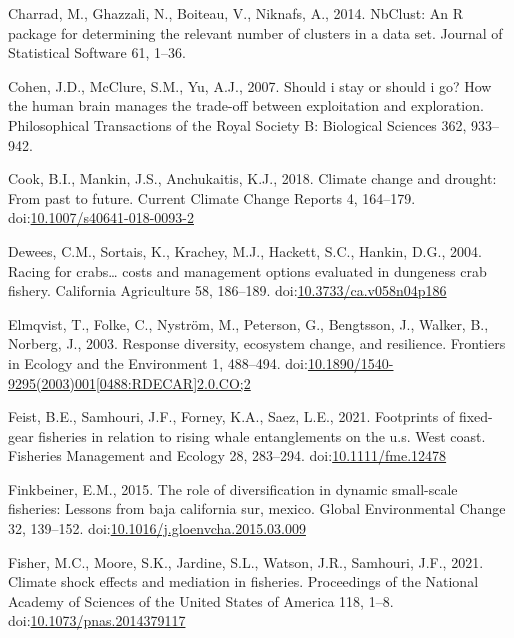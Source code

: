 \documentclass[]{elsarticle} %
\begin{document}
\leavevmode\hypertarget{ref-nbclust2014}{}%
Charrad, M., Ghazzali, N., Boiteau, V., Niknafs, A., 2014. NbClust: An R
package for determining the relevant number of clusters in a data set.
Journal of Statistical Software 61, 1--36.

\leavevmode\hypertarget{ref-Cohen2007}{}%
Cohen, J.D., McClure, S.M., Yu, A.J., 2007. Should i stay or should i
go? How the human brain manages the trade-off between exploitation and
exploration. Philosophical Transactions of the Royal Society B:
Biological Sciences 362, 933--942.

\leavevmode\hypertarget{ref-Cook2018}{}%
Cook, B.I., Mankin, J.S., Anchukaitis, K.J., 2018. Climate change and
drought: From past to future. Current Climate Change Reports 4,
164--179.
doi:\href{https://doi.org/10.1007/s40641-018-0093-2}{10.1007/s40641-018-0093-2}

\leavevmode\hypertarget{ref-Dewees2004}{}%
Dewees, C.M., Sortais, K., Krachey, M.J., Hackett, S.C., Hankin, D.G.,
2004. Racing for crabs\ldots{} costs and management options evaluated in
dungeness crab fishery. California Agriculture 58, 186--189.
doi:\href{https://doi.org/10.3733/ca.v058n04p186}{10.3733/ca.v058n04p186}

\leavevmode\hypertarget{ref-Elmqvist2003a}{}%
Elmqvist, T., Folke, C., Nyström, M., Peterson, G., Bengtsson, J.,
Walker, B., Norberg, J., 2003. Response diversity, ecosystem change, and
resilience. Frontiers in Ecology and the Environment 1, 488--494.
doi:\href{https://doi.org/10.1890/1540-9295(2003)001\%5B0488:RDECAR\%5D2.0.CO;2}{10.1890/1540-9295(2003)001{[}0488:RDECAR{]}2.0.CO;2}

\leavevmode\hypertarget{ref-Feist2021}{}%
Feist, B.E., Samhouri, J.F., Forney, K.A., Saez, L.E., 2021. Footprints
of fixed-gear fisheries in relation to rising whale entanglements on the
u.s. West coast. Fisheries Management and Ecology 28, 283--294.
doi:\href{https://doi.org/10.1111/fme.12478}{10.1111/fme.12478}

\leavevmode\hypertarget{ref-Finkbeiner2015}{}%
Finkbeiner, E.M., 2015. The role of diversification in dynamic
small-scale fisheries: Lessons from baja california sur, mexico. Global
Environmental Change 32, 139--152.
doi:\href{https://doi.org/10.1016/j.gloenvcha.2015.03.009}{10.1016/j.gloenvcha.2015.03.009}

\leavevmode\hypertarget{ref-Fisher2021}{}%
Fisher, M.C., Moore, S.K., Jardine, S.L., Watson, J.R., Samhouri, J.F.,
2021. Climate shock effects and mediation in fisheries. Proceedings of
the National Academy of Sciences of the United States of America 118,
1--8.
doi:\href{https://doi.org/10.1073/pnas.2014379117}{10.1073/pnas.2014379117}
\end{document}
